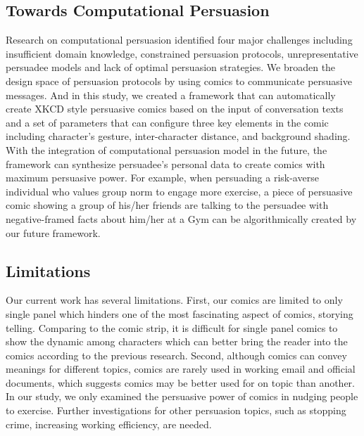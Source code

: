 \subsection{Towards Computational Persuasion}
Research on computational persuasion identified four major challenges including insufficient domain knowledge, constrained persuasion protocols, unrepresentative persuadee models and lack of optimal persuasion strategies\cite{huntertowards}. We broaden the design space of persuasion protocols by using comics to communicate persuasive messages. And in this study, we created a framework that can automatically create XKCD style persuasive comics based on the input of conversation texts and a set of parameters that can configure three key elements in the comic including character's gesture, inter-character distance, and background shading. With the integration of computational persuasion model in the future, the framework can synthesize persuadee's personal data to create comics with maximum persuasive power. For example, when persuading a risk-averse individual who values group norm to engage more exercise, a piece of persuasive comic showing a group of his/her friends are talking to the persuadee with negative-framed facts about him/her at a Gym can be algorithmically created by our future framework.

\subsection{Limitations}
Our current work has several limitations. First, our comics are limited to only single panel which hinders one of the most fascinating aspect of comics, storying telling. Comparing to the comic strip, it is difficult for single panel comics to show the dynamic among characters which can better bring the reader into the comics according to the previous research. Second, although comics can convey meanings for different topics, comics are rarely used in working email and official documents, which suggests comics may be better used for on topic than another. In our study, we only examined the persuasive power of comics in nudging people to exercise. Further investigations for other persuasion topics, such as stopping crime, increasing working efficiency, are needed.
